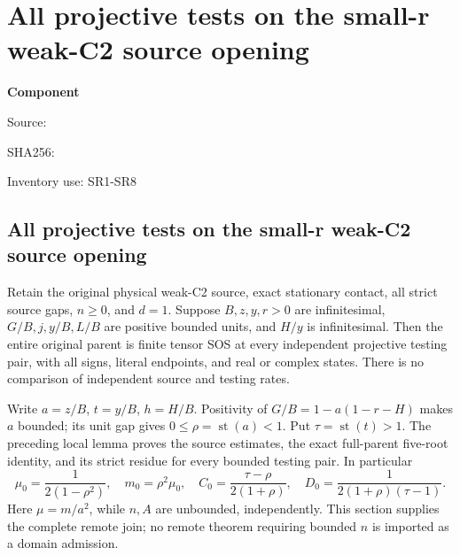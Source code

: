 \chapter{All projective tests on the small-r weak-C2 source opening}
\label{component:p34609a6519a6}
\noindent\textbf{Component }\par
{\small\noindent Source: \par}
{\small\noindent SHA256: \par}
{\small\noindent Inventory use: SR1-SR8\par}
\medskip
\section{All projective tests on the small-r weak-C2 source opening}
\label{p34609a6519a6:sec:r11-small-r-remote}
\begin{theorem}
Retain the original physical weak-C2 source, exact stationary contact,
all strict source gaps, $n\ge0$, and $d=1$. Suppose $B,z,y,r>0$
are infinitesimal, $G/B,j,y/B,L/B$ are positive bounded units,
and $H/y$ is infinitesimal. Then the entire original parent is
finite tensor SOS at every independent projective testing pair,
with all signs, literal endpoints, and real or complex states.
There is no comparison of independent source and testing rates.
\end{theorem}
Write $a=z/B$, $t=y/B$, $h=H/B$. Positivity of
$G/B=1-a(1-r-H)$ makes $a$ bounded; its unit gap gives
$0\le\rho=\operatorname{st}(a)<1$. Put
$\tau=\operatorname{st}(t)>1$. The preceding local lemma proves
the source estimates, the exact full-parent five-root identity,
and its strict residue for every bounded testing pair. In particular
\[
 \mu_0=\frac1{2(1-\rho^2)},\quad m_0=\rho^2\mu_0,\quad
 C_0=\frac{\tau-\rho}{2(1+\rho)},\quad
 D_0=\frac1{2(1+\rho)(\tau-1)}.                 \tag{SR1}
\]
Here $\mu=m/a^2$, while $n,A$ are unbounded, independently.
This section supplies the complete remote join; no remote theorem
requiring bounded $n$ is imported as a domain admission.

